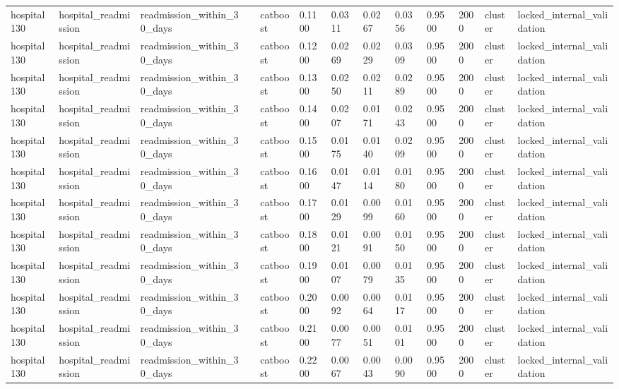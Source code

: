 \begin{tabular}{lllllllllllll}
hospital130 & hospital\_readmission & readmission\_within\_30\_days &  & catboost & 0.1100 & 0.0311 & 0.0267 & 0.0356 & 0.9500 & 2000 & cluster & locked\_internal\_validation \\
hospital130 & hospital\_readmission & readmission\_within\_30\_days &  & catboost & 0.1200 & 0.0269 & 0.0229 & 0.0309 & 0.9500 & 2000 & cluster & locked\_internal\_validation \\
hospital130 & hospital\_readmission & readmission\_within\_30\_days &  & catboost & 0.1300 & 0.0250 & 0.0211 & 0.0289 & 0.9500 & 2000 & cluster & locked\_internal\_validation \\
hospital130 & hospital\_readmission & readmission\_within\_30\_days &  & catboost & 0.1400 & 0.0207 & 0.0171 & 0.0243 & 0.9500 & 2000 & cluster & locked\_internal\_validation \\
hospital130 & hospital\_readmission & readmission\_within\_30\_days &  & catboost & 0.1500 & 0.0175 & 0.0140 & 0.0209 & 0.9500 & 2000 & cluster & locked\_internal\_validation \\
hospital130 & hospital\_readmission & readmission\_within\_30\_days &  & catboost & 0.1600 & 0.0147 & 0.0114 & 0.0180 & 0.9500 & 2000 & cluster & locked\_internal\_validation \\
hospital130 & hospital\_readmission & readmission\_within\_30\_days &  & catboost & 0.1700 & 0.0129 & 0.0099 & 0.0160 & 0.9500 & 2000 & cluster & locked\_internal\_validation \\
hospital130 & hospital\_readmission & readmission\_within\_30\_days &  & catboost & 0.1800 & 0.0121 & 0.0091 & 0.0150 & 0.9500 & 2000 & cluster & locked\_internal\_validation \\
hospital130 & hospital\_readmission & readmission\_within\_30\_days &  & catboost & 0.1900 & 0.0107 & 0.0079 & 0.0135 & 0.9500 & 2000 & cluster & locked\_internal\_validation \\
hospital130 & hospital\_readmission & readmission\_within\_30\_days &  & catboost & 0.2000 & 0.0092 & 0.0064 & 0.0117 & 0.9500 & 2000 & cluster & locked\_internal\_validation \\
hospital130 & hospital\_readmission & readmission\_within\_30\_days &  & catboost & 0.2100 & 0.0077 & 0.0051 & 0.0101 & 0.9500 & 2000 & cluster & locked\_internal\_validation \\
hospital130 & hospital\_readmission & readmission\_within\_30\_days &  & catboost & 0.2200 & 0.0067 & 0.0043 & 0.0090 & 0.9500 & 2000 & cluster & locked\_internal\_validation \\

\end{tabular}
